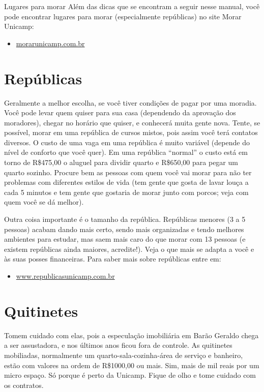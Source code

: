 \begin{story}{Lugares para morar}
Além das dicas que se encontram a seguir nesse manual, você pode encontrar lugares para morar (especialmente repúblicas) no site Morar Unicamp:

\begin{itemize}
\item \url{morarunicamp.com.br}
\end{itemize}

\section*{Repúblicas}

Geralmente a melhor escolha, se você tiver condições de pagar por uma moradia. Você pode levar quem quiser para sua casa (dependendo da aprovação dos moradores), chegar no horário que quiser, e conhecerá muita gente nova. Tente, se possível, morar em uma república de cursos mistos, pois assim você terá contatos diversos. O custo de uma vaga em uma república é muito variável (depende do nível de conforto que você quer). Em uma república ``normal'' o custo está em torno de R\$475,00 o aluguel para dividir quarto e R\$650,00 para pegar um quarto sozinho. Procure bem as pessoas com quem você vai morar para não ter problemas com diferentes estilos de vida (tem gente que gosta de lavar louça a cada 5 minutos e tem gente que gostaria de morar junto com porcos; veja com quem você se dá melhor).

Outra coisa importante é o tamanho da república. Repúblicas menores (3 a 5 pessoas) acabam dando mais certo, sendo mais organizadas e tendo melhores ambientes para estudar, mas saem mais caro do que morar com 13 pessoas (e existem repúblicas ainda maiores, acredite!). Veja o que mais se adapta a você e às suas posses financeiras. Para saber mais sobre repúblicas entre em:

\begin{itemize}
\item \url{www.republicasunicamp.com.br}
\end{itemize}

\section*{Quitinetes}

Tomem cuidado com elas, pois a especulação imobiliária em Barão Geraldo chega a ser assustadora, e nos últimos anos ficou fora de controle. As quitinetes mobiliadas, normalmente um quarto-sala-cozinha-área de serviço e banheiro, estão com valores na ordem de R\$1000,00 ou mais. Sim, mais de mil reais por um micro espaço. Só porque é perto da Unicamp. Fique de olho e tome cuidado com os contratos.


\end{story}
